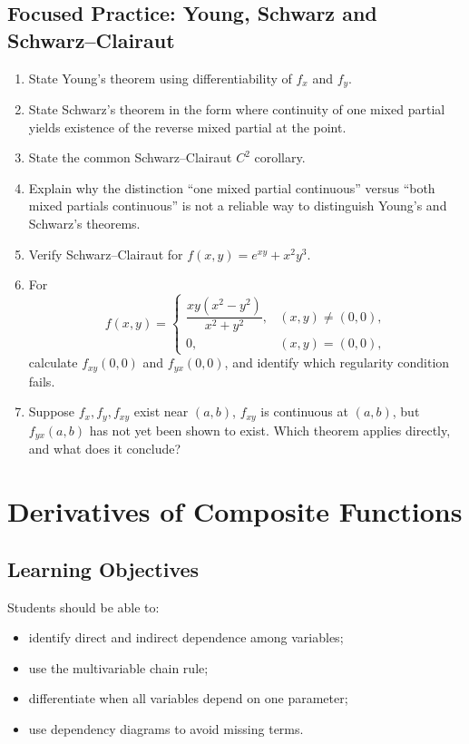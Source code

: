 \documentclass[11pt,oneside]{book}
\theoremstyle{studentthm}
\theoremstyle{definition}
\begin{document}
\section{Focused Practice: Young, Schwarz and Schwarz--Clairaut}

\begin{enumerate}
\item State Young's theorem using differentiability of \(f_x\) and \(f_y\).
\item State Schwarz's theorem in the form where continuity of one mixed partial yields existence of the reverse mixed partial at the point.
\item State the common Schwarz--Clairaut \(C^2\) corollary.
\item Explain why the distinction ``one mixed partial continuous'' versus ``both mixed partials continuous'' is not a reliable way to distinguish Young's and Schwarz's theorems.
\item Verify Schwarz--Clairaut for \(f(x,y)=e^{xy}+x^2y^3\).
\item For
\[
f(x,y)=\begin{cases}\dfrac{xy(x^2-y^2)}{x^2+y^2},&(x,y)\ne(0,0),\\0,&(x,y)=(0,0),\end{cases}
\]
calculate \(f_{xy}(0,0)\) and \(f_{yx}(0,0)\), and identify which regularity condition fails.
\item Suppose \(f_x,f_y,f_{xy}\) exist near \((a,b)\), \(f_{xy}\) is continuous at \((a,b)\), but \(f_{yx}(a,b)\) has not yet been shown to exist. Which theorem applies directly, and what does it conclude?
\end{enumerate}

\chapter{Derivatives of Composite Functions}

\section*{Learning Objectives}
Students should be able to:
\begin{itemize}
\item identify direct and indirect dependence among variables;
\item use the multivariable chain rule;
\item differentiate when all variables depend on one parameter;
\item use dependency diagrams to avoid missing terms.
\end{itemize}
\end{document}
